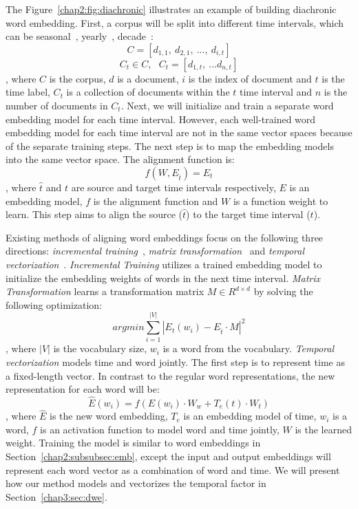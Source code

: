 The Figure~\ref{chap2:fig:diachronic} illustrates an example of building diachronic word embedding.
First, a corpus will be split into different time intervals, which can be seasonal~\cite{huang2018examining}, yearly~\cite{yao2018dynamic}, decade~\cite{hamilton2016diachronic}:
$$C = [d_{1, 1}, ~d_{2, 1}, ~..., ~d_{i, t}] $$
$$C_t \in C, ~~~ C_t = [d_{1, t},~ ...d_{n, t}]$$
, where $C$ is the corpus, $d$ is a document, $i$ is the index of document and $t$ is the time label, $C_t$ is a collection of documents within the $t$ time interval and $n$ is the number of documents in $C_t$.
Next, we will initialize and train a separate word embedding model for each time interval.
However, each well-trained word embedding model for each time interval are not in the same vector spaces because of the separate training steps. 
The next step is to map the embedding models into the same vector space.
The alignment function is:
$$f(W, E_{\hat{t}}) = E_t$$
, where $\hat{t}$ and $t$ are source and target time intervals respectively, $E$ is an embedding model, $f$ is the alignment function and $W$ is a function weight to learn.
This step aims to align the source ($\hat{t}$) to the target time interval ($t$).

Existing methods of aligning word embeddings focus on the following three directions: \textit{incremental training}~\cite{kim2014temporal}, \textit{matrix transformation}~\cite{kulkarni2015statistically, hamilton2016diachronic, yao2018dynamic} and \textit{temporal vectorization}~\cite{rosenfeld2018deep, huang2019neural}. 
\textit{Incremental Training} utilizes a trained embedding model to initialize the embedding weights of words in the next time interval.
\textit{Matrix Transformation} learns a transformation matrix $M \in R^{d \times d}$ by solving the following optimization:
$$argmin \sum_{i=1}^{|V|}|E_t(w_i) - E_{\hat{t}} \cdot M|^2$$
, where $|V|$ is the vocabulary size, $w_i$ is a word from the vocabulary.
\textit{Temporal vectorization} models time and word jointly. The first step is to represent time as a fixed-length vector. In contrast to the regular word representations, the new representation for each word will be:
$$\hat{E}(w_i) = f(E(w_i) \cdot W_w + T_e(t) \cdot W_t)$$
, where $\hat{E}$ is the new word embedding, $T_e$ is an embedding model of time, $w_i$ is a word, $f$ is an activation function to model word and time jointly, $W$ is the learned weight.
Training the model is similar to word embeddings in Section~\ref{chap2:subsubsec:emb}, except the input and output embeddings will represent each word vector as a combination of word and time.
We will present how our method models and vectorizes the temporal factor in Section~\ref{chap3:sec:dwe}.


